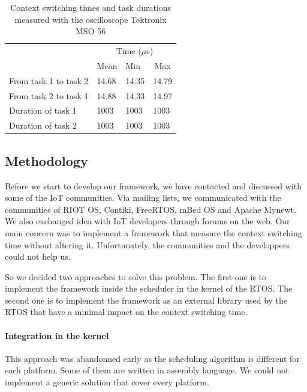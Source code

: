\begin{table}[!ht]
  \centering
  \begin{tabular}{llll}
                        & \multicolumn{3}{c}{Time ($\mu$s)}                              \\ \cline{2-4} 
                        & \multicolumn{1}{c}{Mean} & Min   & \multicolumn{1}{c}{Max} \\ \cline{2-4} 
  From task 1 to task 2 & 14.68                    & 14.35 & 14.79                   \\
  From task 2 to task 1 & 14.88                    & 14.33 & 14.97                   \\
  Duration of task 1    & 1003                     & 1003  & 1003                    \\
  Duration of task 2    & 1003                     & 1003  & 1003                   
  \end{tabular}
  \caption{Context switching times and task durations measured with the oscilloscope Tektronix MSO 56}
  \label{tab:reference-measurement}
\end{table}


\subsection{Methodology}

Before we start to develop our framework, we have contacted and discussed with some of the IoT communities.
Via mailing lists, we communicated with the communities of RIOT OS, Contiki, FreeRTOS, mBed OS and Apache Mynewt.
We also exchanged idea with IoT developers through forums on the web.
Our main concern was to implement a framework that measure the context switching time without altering it.
Unfortunately, the communities and the developpers could not help us.

So we decided two approaches to solve this problem.
The first one is to implement the framework inside the scheduler in the kernel of the RTOS.
The second one is to implement the framework as an external library used by the RTOS that have a minimal impact on the context switching time.

\paragraph{Integration in the kernel}
This approach was abandonned early as the scheduling algorithm is different for each platform.
Some of them are written in assembly language.
We could not implement a generic solution that cover every platform.

